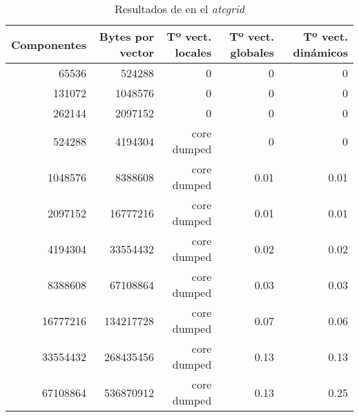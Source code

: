 \begin{center}
\begin{table}[!h]
\begin{tabular}{r r r r r}
\textbf{Componentes} & \textbf{Bytes por vector} & \textbf{Tº vect. locales} & \textbf{Tº vect. globales} & \textbf{Tº vect. dinámicos} \\
\toprule
65536                & 524288                    & 0                         & 0                          & 0                           \\
131072               & 1048576                   & 0                         & 0                          & 0                           \\
262144               & 2097152                   & 0                         & 0                          & 0                           \\
524288               & 4194304                   & core dumped               & 0                          & 0                           \\
1048576              & 8388608                   & core dumped               & 0.01                       & 0.01                        \\
2097152              & 16777216                  & core dumped               & 0.01                       & 0.01                        \\
4194304              & 33554432                  & core dumped               & 0.02                       & 0.02                        \\
8388608              & 67108864                  & core dumped               & 0.03                       & 0.03                        \\
16777216             & 134217728                 & core dumped               & 0.07                       & 0.06                        \\
33554432             & 268435456                 & core dumped               & 0.13                       & 0.13                        \\
67108864             & 536870912                 & core dumped               & 0.13                       & 0.25                        \\
\end{tabular}
\caption{Resultados de  en el \textit{atcgrid}}
\end{table}
\end{center}

\section{}\label{ej1-8}

